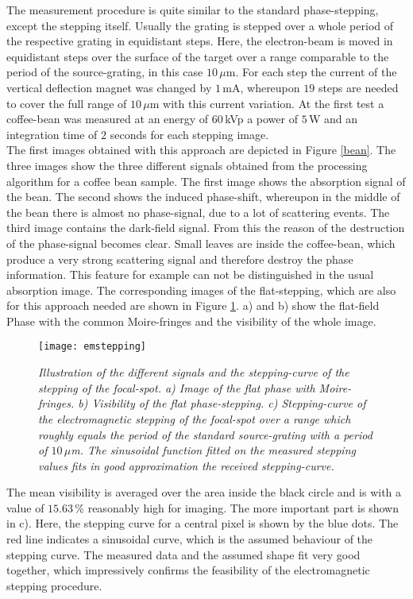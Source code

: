 The measurement procedure is quite similar to the standard phase-stepping, except the stepping itself. Usually the grating is stepped over a whole period of the respective grating in equidistant steps. Here, the electron-beam is moved in equidistant steps over the surface of the target over a range comparable to the period of the source-grating, in this case $10\, \mu$m. For each step the current of the vertical deflection magnet was changed by $1\,$mA, whereupon $19$ steps are needed to cover the full range of $10\, \mu$m with this current variation. At the first test a coffee-bean was measured at an energy of $60\,$kVp a power of $5\,$W and an integration time of $2$ seconds for each stepping image.\\

The first images obtained with this approach are depicted in Figure \ref{bean}. The three images show the three different signals obtained from the processing algorithm for a coffee bean sample. The first image shows the absorption signal of the bean. The second shows the induced phase-shift, whereupon in the middle of the bean there is almost no phase-signal, due to a lot of scattering events. The third image contains the dark-field signal. From this the reason of the destruction of the phase-signal becomes clear. Small leaves are inside the coffee-bean, which produce a very strong scattering signal and therefore destroy the phase information. This feature for example can not be distinguished in the usual absorption image. The corresponding images of the \gls{flat}-stepping, which are also for this approach needed are shown in Figure \ref{emstepp}. a) and b) show the flat-field Phase with the common Moire-fringes and the visibility of the whole image.
\begin{figure}[h]
	\begin{center}
		\texttt{[image: emstepping]}
	\end{center}
	\caption[Illustration of visibility an stepping-curve of the electro-magnetic stepping procedure]{\textit{Illustration of the different signals and the stepping-curve of the stepping of the focal-spot. a) Image of the \gls{flat} phase with Moire-fringes. b) Visibility of the \gls{flat} phase-stepping. c) Stepping-curve of the electromagnetic stepping of the focal-spot over a range which roughly equals the period of the standard source-grating with a period of $10\, \mu$m. The sinusoidal function fitted on the measured stepping values fits in good approximation the received stepping-curve.}}
	\label{emstepp}
\end{figure}
\clearpage
The mean visibility is averaged over the area inside the black circle and is with a value of $15.63\,$\% reasonably high for imaging. The more important part is shown in c). Here, the stepping curve for a central pixel is shown by the blue dots. The red line indicates a sinusoidal curve, which is the assumed behaviour of the stepping curve. The measured data and the assumed shape fit very good together, which impressively confirms the feasibility of the electromagnetic stepping procedure.     

